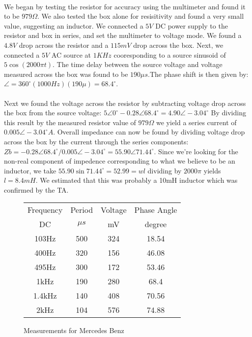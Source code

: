 \documentclass{article}
\begin{document}
\paragraph{}
We began by testing the resistor for accuracy using the multimeter and found
it to be $979\Omega{}$. We also tested the box alone for resisitivity and found
a very small value, suggesting an inductor. We connected a $5V$ DC power supply
to the resistor and box in series, and set the multimeter to voltage mode. We
found a $4.8V$ drop across the resistor and a $115mV$ drop across the box. Next,
we connected a $5V$ AC source at $1KHz$ cooresponding to a source sinusoid of
$5\cos{}(2000\pi{} t)$. The time delay between the source voltage and voltage 
measured across the box was found to be $190\mu{} s$.The phase shift is then 
given by: $\angle{} = 360^\circ{}(1000Hz)(190\mu{}) = 68.4^\circ{}$. 

\paragraph{} 
Next we found the voltage across the resistor by subtracting voltage drop across
the box from the source voltage:
$5\angle{}0^\circ{} - 0.28\angle{}68.4^\circ{} = 4.90\angle{}-3.04^\circ{}$ By
dividing this result by the measured resistor value of $979\Omega$ we yield a 
series current of $0.005\angle{}-3.04^\circ{}A$. Overall impedance can now be 
found by dividing voltage drop across the box by the current through the series
components: 
$Zb= -0.28\angle{}68.4^\circ{} / 0.005\angle{}-3.04^\circ{} = 55.90\angle{}71.44^\circ{}$.
Since we're looking for the non-real component of impedence corresponding to what 
we believe to be an inductor, we take $55.90\sin{}71.44^\circ{} = 52.99 = wl$ 
dividing by $2000\pi{}$ yields $l=8.4mH$. We estimated that this was probably
a 10mH inductor which was confirmed by the TA.   


\begin{figure}[!h]
\caption{Measurements for Mercedes Benz}
\begin{center}
\begin{tabular}{|c|c|c|c|}
\hline
Frequency & Period & Voltage & Phase Angle\\
DC & $\mu{}s$ & mV & degree\\
\hline
103Hz & 500 & 324 & 18.54\\
\hline
400Hz & 320 & 156 & 46.08\\
\hline
495Hz & 300 & 172 & 53.46\\
\hline
1kHz & 190 & 280 & 68.4\\
\hline
1.4kHz & 140 & 408 & 70.56\\
\hline
2kHz & 104 & 576 & 74.88\\
\hline
\end{tabular}
\end{center}
\end{figure}
\end{document}
